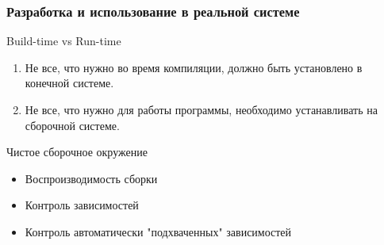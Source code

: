 \begin{frame}
	\frametitle{Разработка и использование в реальной системе}
	
	\begin{block}{Build-time vs Run-time}

		\begin{enumerate}
			\item Не все, что нужно во время компиляции, должно быть установлено в конечной системе.
			\item Не все, что нужно для работы программы, необходимо устанавливать на сборочной системе.
		\end{enumerate}
	\end{block}
	\begin{block}{Чистое сборочное окружение}
		\begin{itemize}
			\item Воспроизводимость сборки 
			\item Контроль зависимостей
			\item Контроль автоматически "подхваченных" зависимостей
		\end{itemize}
	\end{block}
\end{frame}

